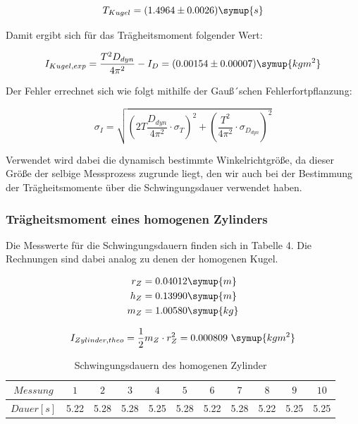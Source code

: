 \begin{equation}
  T_{Kugel} = (1.4964 \pm 0.0026) \symup{s}
\end{equation}

Damit ergibt sich für das Trägheitsmoment folgender Wert:

\begin{equation}
  I_{Kugel,exp} = \frac{T^2 D_{dyn}}{4\pi^2} - I_D = (0.00154 \pm 0.00007) \symup{kg m^2}
\end{equation}

Der Fehler errechnet sich wie folgt mithilfe der Gauß´schen Fehlerfortpflanzung:

\begin{equation}
  \sigma_I = \sqrt{(2T \frac{D_{dyn}}{4\pi^2} \cdot \sigma_T)^2 + (\frac{T^2}{4\pi^2} \cdot \sigma_{D_{dyn}})^2}
    \label{eqn:sigma}
\end{equation}

Verwendet wird dabei die dynamisch bestimmte Winkelrichtgröße, da dieser Größe der selbige
Messprozess zugrunde liegt, den wir auch bei der Bestimmung der Trägheitsmomente über die
Schwingungsdauer verwendet haben.

\subsubsection{Trägheitsmoment eines homogenen Zylinders}

Die Messwerte für die Schwingungsdauern finden sich in Tabelle 4. Die Rechnungen sind dabei analog
zu denen der homogenen Kugel.

\begin{align}
  r_Z &= 0.04012  \symup{m} \\
  h_Z &= 0.13990  \symup{m} \\
  m_Z &= 1.00580  \symup{kg}
\end{align}

\begin{equation}
  I_{Zylinder,theo} = \frac{1}{2} m_Z \cdot r_Z^2 = 0.000809 \,\, \symup{kg m^2}
\end{equation}

\begin{table}
  \centering
  \caption{Schwingungsdauern des homogenen Zylinder}
  \begin{tabular}{c c c c c c c c c c c}
    \toprule $Messung$ & $1$ & $2$ & $3$ & $4$ & $5$ & $6$ & $7$ & $8$ & $9$ & $10$ \\
    \midrule $Dauer [s]$ & 5.22 & 5.28 & 5.28 & 5.25 & 5.28 & 5.22 & 5.28 & 5.22 & 5.25 & 5.25\\
    \bottomrule
  \end{tabular}
\end{table}

